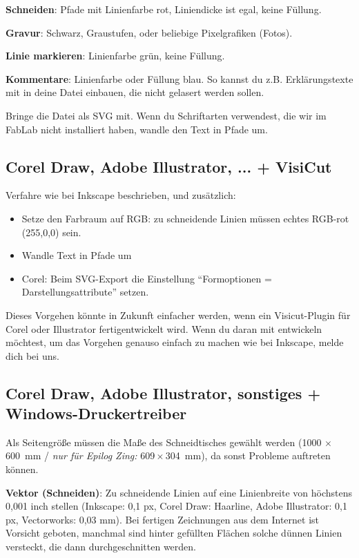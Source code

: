 \documentclass{\basedir/fablab-document}
\newcommand{\nurZing}{\emph{nur für Epilog Zing:} }
\begin{document}
	\textbf{Schneiden}: Pfade mit Linienfarbe rot, Liniendicke ist egal, keine Füllung.
	
	\textbf{Gravur}: Schwarz, Graustufen, oder beliebige Pixelgrafiken (Fotos).
	
	\textbf{Linie markieren}: Linienfarbe grün, keine Füllung.
	
	\textbf{Kommentare}: Linienfarbe oder Füllung blau. So kannst du z.B. Erklärungstexte mit in deine Datei einbauen, die nicht gelasert werden sollen.
	
	Bringe die Datei als SVG mit. Wenn du Schriftarten verwendest, die wir im FabLab nicht installiert haben, wandle den Text in Pfade um.
	
	
	\subsection{Corel Draw, Adobe Illustrator, ... + VisiCut}
	\label{corel-illustrator-svg-visicut}
	Verfahre wie bei Inkscape beschrieben, und zusätzlich:
	
	\begin{itemize}
		\item Setze den Farbraum auf RGB: zu schneidende Linien müssen echtes RGB-rot (255,0,0) sein.
		\item Wandle Text in Pfade um
		\item Corel: Beim SVG-Export die Einstellung \enquote{Formoptionen = Darstellungsattribute} setzen.
	\end{itemize}
	
	Dieses Vorgehen könnte in Zukunft einfacher werden, wenn ein Visicut-Plugin für Corel oder Illustrator fertigentwickelt wird. Wenn du daran mit entwickeln möchtest, um das Vorgehen genauso einfach zu machen wie bei Inkscape, melde dich bei uns.
	
	\subsection{Corel Draw, Adobe Illustrator, sonstiges + Windows-Druckertreiber} \label{sec:einstellungen-windowstreiber}
	Als Seitengröße müssen die Maße des Schneidtisches gewählt werden (1000 $\times$ 600~mm / \nurZing 609\,$\times$\,304~mm), da sonst Probleme auftreten können.
	
	\textbf{Vektor (Schneiden)}: Zu schneidende Linien auf eine Linienbreite von höchstens 0,001 inch stellen (Inkscape: 0,1 px, Corel Draw: Haarline, Adobe Illustrator: 0,1 px, Vectorworks: 0,03 mm). Bei fertigen Zeichnungen aus dem Internet ist Vorsicht geboten, manchmal sind hinter gefüllten Flächen solche dünnen Linien versteckt, die dann durchgeschnitten werden.
	
\end{document}
